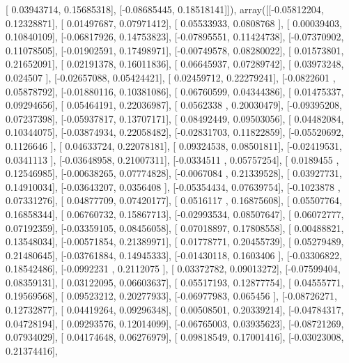 \documentclass{article}
\begin{document}
       [ 0.03943714,  0.15685318],
       [-0.08685445,  0.18518141]]), array([[-0.05812204,  0.12328871],
       [ 0.01497687,  0.07971412],
       [ 0.05533933,  0.0808768 ],
       [ 0.00039403,  0.10840109],
       [-0.06817926,  0.14753823],
       [-0.07895551,  0.11424738],
       [-0.07370902,  0.11078505],
       [-0.01902591,  0.17498971],
       [-0.00749578,  0.08280022],
       [ 0.01573801,  0.21652091],
       [ 0.02191378,  0.16011836],
       [ 0.06645937,  0.07289742],
       [ 0.03973248,  0.024507  ],
       [-0.02657088,  0.05424421],
       [ 0.02459712,  0.22279241],
       [-0.0822601 ,  0.05878792],
       [-0.01880116,  0.10381086],
       [ 0.06760599,  0.04344386],
       [ 0.01475337,  0.09294656],
       [ 0.05464191,  0.22036987],
       [ 0.0562338 ,  0.20030479],
       [-0.09395208,  0.07237398],
       [-0.05937817,  0.13707171],
       [ 0.08492449,  0.09503056],
       [ 0.04482084,  0.10344075],
       [-0.03874934,  0.22058482],
       [-0.02831703,  0.11822859],
       [-0.05520692,  0.1126646 ],
       [ 0.04633724,  0.22078181],
       [ 0.09324538,  0.08501811],
       [-0.02419531,  0.0341113 ],
       [-0.03648958,  0.21007311],
       [-0.0334511 ,  0.05757254],
       [ 0.0189455 ,  0.12546985],
       [-0.00638265,  0.07774828],
       [-0.0067084 ,  0.21339528],
       [ 0.03927731,  0.14910034],
       [-0.03643207,  0.0356408 ],
       [-0.05354434,  0.07639754],
       [-0.1023878 ,  0.07331276],
       [ 0.04877709,  0.07420177],
       [ 0.0516117 ,  0.16875608],
       [ 0.05507764,  0.16858344],
       [ 0.06760732,  0.15867713],
       [-0.02993534,  0.08507647],
       [ 0.06072777,  0.07192359],
       [-0.03359105,  0.08456058],
       [ 0.07018897,  0.17808558],
       [ 0.00488821,  0.13548034],
       [-0.00571854,  0.21389971],
       [ 0.01778771,  0.20455739],
       [ 0.05279489,  0.21480645],
       [-0.03761884,  0.14945333],
       [-0.01430118,  0.1603406 ],
       [-0.03306822,  0.18542486],
       [-0.0992231 ,  0.2112075 ],
       [ 0.03372782,  0.09013272],
       [-0.07599404,  0.08359131],
       [ 0.03122095,  0.06603637],
       [ 0.05517193,  0.12877754],
       [ 0.04555771,  0.19569568],
       [ 0.09523212,  0.20277933],
       [-0.06977983,  0.065456  ],
       [-0.08726271,  0.12732877],
       [ 0.04419264,  0.09296348],
       [ 0.00508501,  0.20339214],
       [-0.04784317,  0.04728194],
       [ 0.09293576,  0.12014099],
       [-0.06765003,  0.03935623],
       [-0.08721269,  0.07934029],
       [ 0.04174648,  0.06276979],
       [ 0.09818549,  0.17001416],
       [-0.03023008,  0.21374416],
\end{document}
